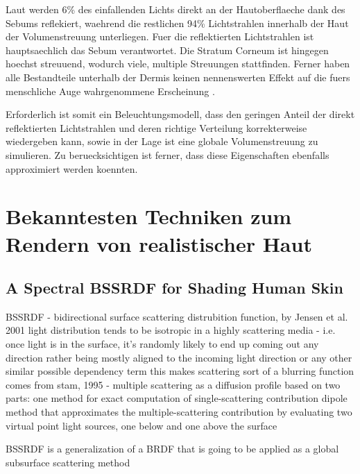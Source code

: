 \documentclass[ngerman,runningheads,a4paper]{llncs}[2018/03/10]
\begin{document}
Laut \citeauthor{tuchin2015tissue} werden 6\% des einfallenden Lichts direkt an der Hautoberflaeche dank des Sebums reflekiert, waehrend die restlichen 94\% Lichtstrahlen innerhalb der Haut der Volumenstreuung unterliegen.
Fuer die reflektierten Lichtstrahlen ist hauptsaechlich das Sebum verantwortet.
Die Stratum Corneum ist hingegen hoechst streuuend, wodurch viele, multiple Streuungen stattfinden.
Ferner haben alle Bestandteile unterhalb der Dermis keinen nennenswerten Effekt auf die fuers menschliche Auge wahrgenommene Erscheinung \cite{tuchin2015tissue}.

Erforderlich ist somit ein Beleuchtungsmodell, dass den geringen Anteil der direkt reflektierten Lichtstrahlen und deren richtige Verteilung korrekterweise wiedergeben kann, sowie in der Lage ist eine globale Volumenstreuung zu simulieren.
Zu beruecksichtigen ist ferner, dass diese Eigenschaften ebenfalls approximiert werden koennten.

\section{Bekanntesten Techniken zum Rendern von realistischer Haut}
\label{sec:application}

\subsection{A Spectral BSSRDF for Shading Human Skin}
\label{sub:spectral-bssrdf}

\citet{spectral-bssrdf-human-skin}

 BSSRDF - bidirectional surface scattering distrubition function, by Jensen et al. 2001
         light distribution tends to be isotropic in a highly scattering media - i.e. once light is in the surface, it's randomly likely to end up coming out any direction rather being mostly aligned to the incoming light direction or any other similar possible dependency term
           this makes scattering sort of a blurring function
             comes from stam, 1995 - multiple scattering as a diffusion profile
           based on two parts:
             one method for exact computation of single-scattering contribution
             dipole method that approximates the multiple-scattering contribution by evaluating two virtual point light sources, one below and one above the surface

             BSSRDF is a generalization of a BRDF that is going to be applied as a global subsurface scattering method
\end{document}
